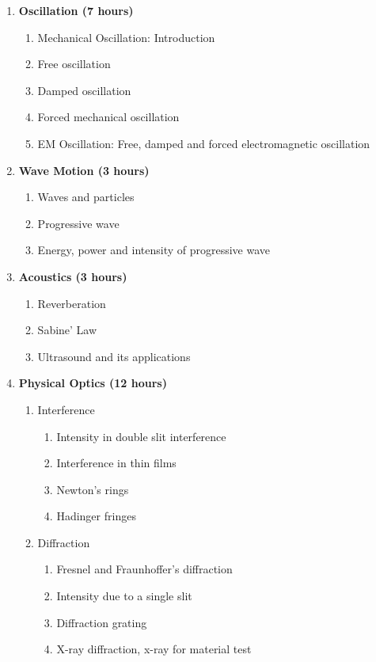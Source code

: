 \begin{enumerate}
    \item \textbf{Oscillation \hfill (7 hours)}
    \begin{enumerate}
        \item Mechanical Oscillation: Introduction
        \item Free oscillation
        \item Damped oscillation
        \item Forced mechanical oscillation
        \item EM Oscillation: Free, damped and forced electromagnetic oscillation
    \end{enumerate}
    
    \item \textbf{Wave Motion \hfill (3 hours)}
    \begin{enumerate}
        \item Waves and particles
        \item Progressive wave
        \item Energy, power and intensity of progressive wave
    \end{enumerate}
    
    \item \textbf{Acoustics \hfill (3 hours)}
    \begin{enumerate}
        \item Reverberation
        \item Sabine' Law
        \item Ultrasound and its applications
    \end{enumerate}
    
    \item \textbf{Physical Optics \hfill (12 hours)}
    \begin{enumerate}
        \item Interference
        \begin{enumerate}
            \item Intensity in double slit interference
            \item Interference in thin films
            \item Newton's rings
            \item Hadinger fringes
        \end{enumerate}
        
        \item Diffraction
        \begin{enumerate}
            \item Fresnel and Fraunhoffer's diffraction
            \item Intensity due to a single slit
            \item Diffraction grating
            \item X-ray diffraction, x-ray for material test
        \end{enumerate}
        

\end{enumerate}
\end{enumerate}
